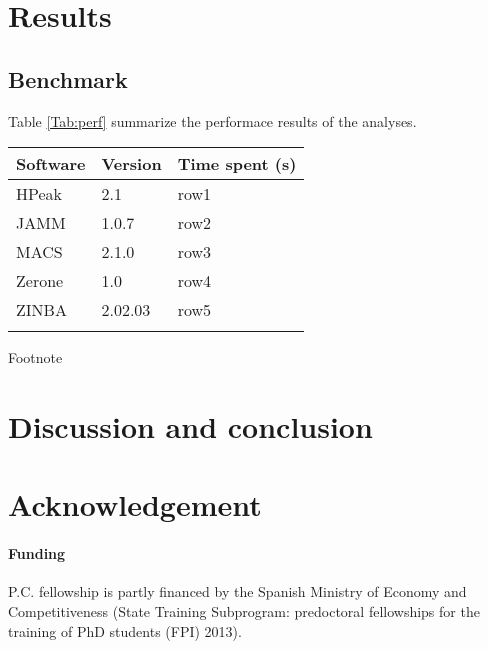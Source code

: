 \documentclass{bioinfo}
\begin{document}
\section{Results}


\subsection{Benchmark}
Table \ref{Tab:perf} summarize the performace results of the analyses.

\begin{table}[!t]
{\begin{tabular}{lll}\toprule
\bf{Software} & \bf{Version} & \bf{Time spent (s)} \\\midrule
HPeak & 2.1 & row1 \\
JAMM & 1.0.7 & row2 \\
MACS & 2.1.0 & row3 \\ %
Zerone & 1.0 & row4 \\
ZINBA & 2.02.03 & row5 \\\botrule
\end{tabular}}{Footnote}
\end{table}

\section{Discussion and conclusion}

\section*{Acknowledgement}

\paragraph{Funding\textcolon}
P.C. fellowship is partly financed by the Spanish Ministry of Economy and
Competitiveness (State Training Subprogram: predoctoral fellowships for the
training of PhD students (FPI) 2013).



\end{document}
